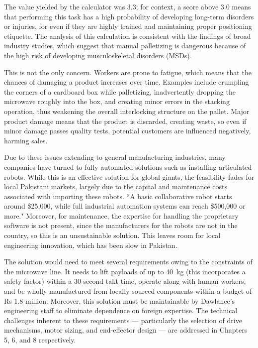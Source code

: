The value yielded by the calculator was 3.3; for context, a score above 3.0 means that performing this task has a high probability of developing long-term disorders or injuries, for  even if they are highly trained and maintaining proper positioning etiquette. The analysis of this calculation is consistent with the findings of broad industry studies, which suggest that manual palletizing is dangerous because of the high risk of developing musculoskeletal disorders (MSDs). \cite{gallagher2015effects, yildirim2014identifying}

This is not the only concern. Workers are prone to fatigue, which means that the chances of damaging a product increases over time. Examples include crumpling the corners of a cardboard box while palletizing, inadvertently dropping the microwave roughly into the box, and creating minor errors in the stacking operation, thus weakening the overall interlocking structure on the pallet. Major product damage means that the product is discarded, creating waste, so even if minor damage passes quality tests, potential customers are influenced negatively, harming sales.

Due to these issues extending to general manufacturing industries, many companies have turned to fully automated solutions such as installing articulated robots. While this is an effective solution for global giants, the feasibility fades for local Pakistani markets, largely due to the capital and maintenance costs associated with importing these robots. ``A basic collaborative robot starts around \$25,000, while full industrial automation systems can reach \$500,000 or more." \cite{standardbots2025costs} Moreover, for maintenance, the expertise for handling the proprietary software is not present, since the manufacturers for the robots are not in the country, so this is an unsustainable solution. This leaves room for local engineering innovation, which has been slow in Pakistan.

The solution would need to meet several requirements owing to the constraints of the microwave line. It needs to lift payloads of up to \qty{40}{kg} (this incorporates a safety factor) within a 30-second takt time, operate along with human workers, and be wholly manufactured from locally sourced components within a budget of Rs 1.8 million. Moreover, this solution must be maintainable by Dawlance's engineering staff to eliminate dependence on foreign expertise. The technical challenges inherent to these requirements --- particularly the selection of drive mechanisms, motor sizing, and end-effector design --- are addressed in Chapters 5, 6, and 8 respectively.

